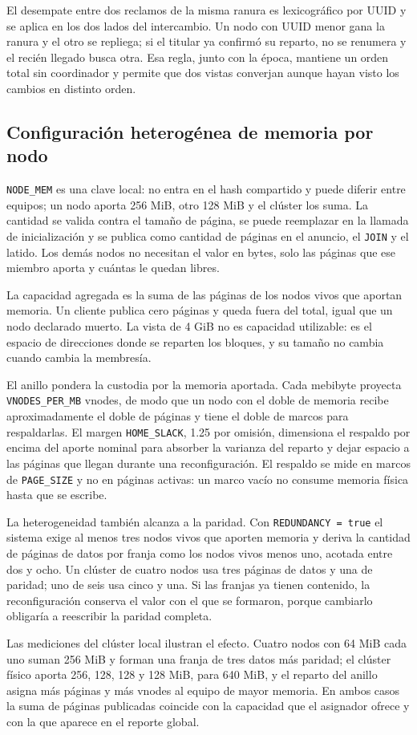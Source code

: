 El desempate entre dos reclamos de la misma ranura es lexicográfico por UUID y se aplica en los dos lados del intercambio. Un nodo con UUID menor gana la ranura y el otro se repliega; si el titular ya confirmó su reparto, no se renumera y el recién llegado busca otra. Esa regla, junto con la época, mantiene un orden total sin coordinador y permite que dos vistas converjan aunque hayan visto los cambios en distinto orden.

\subsection{Configuración heterogénea de memoria por nodo}

\texttt{NODE\_MEM} es una clave local: no entra en el hash compartido y puede diferir entre equipos; un nodo aporta 256 MiB, otro 128 MiB y el clúster los suma. La cantidad se valida contra el tamaño de página, se puede reemplazar en la llamada de inicialización y se publica como cantidad de páginas en el anuncio, el \texttt{JOIN} y el latido. Los demás nodos no necesitan el valor en bytes, solo las páginas que ese miembro aporta y cuántas le quedan libres.

La capacidad agregada es la suma de las páginas de los nodos vivos que aportan memoria. Un cliente publica cero páginas y queda fuera del total, igual que un nodo declarado muerto. La vista de 4 GiB no es capacidad utilizable: es el espacio de direcciones donde se reparten los bloques, y su tamaño no cambia cuando cambia la membresía.

El anillo pondera la custodia por la memoria aportada. Cada mebibyte proyecta \texttt{VNODES\_PER\_MB} vnodes, de modo que un nodo con el doble de memoria recibe aproximadamente el doble de páginas y tiene el doble de marcos para respaldarlas. El margen \texttt{HOME\_SLACK}, 1.25 por omisión, dimensiona el respaldo por encima del aporte nominal para absorber la varianza del reparto y dejar espacio a las páginas que llegan durante una reconfiguración. El respaldo se mide en marcos de \texttt{PAGE\_SIZE} y no en páginas activas: un marco vacío no consume memoria física hasta que se escribe.

La heterogeneidad también alcanza a la paridad. Con \texttt{REDUNDANCY = true} el sistema exige al menos tres nodos vivos que aporten memoria y deriva la cantidad de páginas de datos por franja como los nodos vivos menos uno, acotada entre dos y ocho. Un clúster de cuatro nodos usa tres páginas de datos y una de paridad; uno de seis usa cinco y una. Si las franjas ya tienen contenido, la reconfiguración conserva el valor con el que se formaron, porque cambiarlo obligaría a reescribir la paridad completa.

Las mediciones del clúster local ilustran el efecto. Cuatro nodos con 64 MiB cada uno suman 256 MiB y forman una franja de tres datos más paridad; el clúster físico aporta 256, 128, 128 y 128 MiB, para 640 MiB, y el reparto del anillo asigna más páginas y más vnodes al equipo de mayor memoria. En ambos casos la suma de páginas publicadas coincide con la capacidad que el asignador ofrece y con la que aparece en el reporte global.
